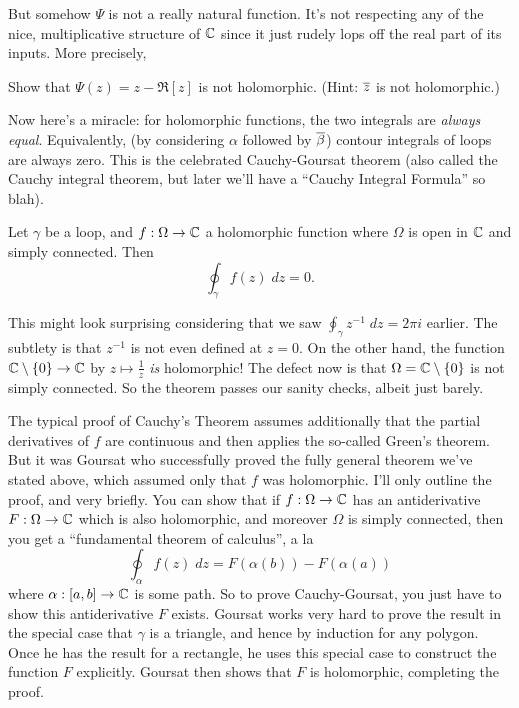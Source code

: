 But somehow $\Psi$ is not a really natural function.
It's not respecting any of the nice, multiplicative structure of $\mathbb C$ since
it just rudely lops off the real part of its inputs.
More precisely,
\begin{ques}
	Show that $\Psi(z) = z - \Re[z]$ is not holomorphic.
	(Hint: $\overline z$ is not holomorphic.)
\end{ques}

Now here's a miracle: for holomorphic functions, the two integrals are \emph{always equal}.
Equivalently, (by considering $\alpha$ followed by $\overline\beta$) contour integrals of loops are always zero.
This is the celebrated Cauchy-Goursat theorem
(also called the Cauchy integral theorem,
but later we'll have a ``Cauchy Integral Formula'' so blah).

\begin{theorem}
	Let $\gamma$ be a loop, and $f : \Omega \to \mathbb C$ a holomorphic function
	where $\Omega$ is open in $\mathbb C$ and simply connected.
	Then
	\[ \oint_\gamma f(z) \; dz = 0. \]
\end{theorem}
\begin{remark}
	This might look surprising considering that we saw $\oint_\gamma z^{-1} \; dz = 2 \pi i$ earlier.
	The subtlety is that $z^{-1}$ is not even defined at $z = 0$.
	On the other hand, the function $\mathbb C \setminus \{0\} \to \mathbb C$ by $z \mapsto \frac 1z$ \emph{is} holomorphic!
	The defect now is that $\Omega = \mathbb C \setminus \{0\}$ is not simply connected.
	So the theorem passes our sanity checks, albeit just barely.
\end{remark}

The typical proof of Cauchy's Theorem assumes additionally
that the partial derivatives of $f$ are continuous
and then applies the so-called Green's theorem.
But it was Goursat who successfully proved the fully general theorem we've stated above,
which assumed only that $f$ was holomorphic.
I'll only outline the proof, and very briefly.
You can show that if $f : \Omega \to \mathbb C$ has an antiderivative $F : \Omega \to \mathbb C$ which is also holomorphic,
and moreover $\Omega$ is simply connected, then you get a ``fundamental theorem of calculus'', a la
\[ \oint_\alpha f(z) \; dz = F(\alpha(b)) - F(\alpha(a)) \]
where $\alpha : [a,b] \to \mathbb C$ is some path.
So to prove Cauchy-Goursat, you just have to show this antiderivative $F$ exists.
Goursat works very hard to prove the result in the special case that $\gamma$ is a triangle,
and hence by induction for any polygon.
Once he has the result for a rectangle, he uses this special case to construct the function $F$ explicitly.
Goursat then shows that $F$ is holomorphic, completing the proof.

